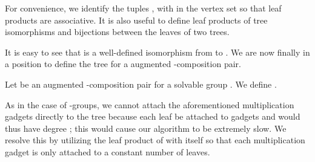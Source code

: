 
For convenience, we identify the tuples ,  with  in the vertex set so that leaf products are associative.  It is also useful to define leaf products of tree isomorphisms and bijections between the leaves of two trees.


It is easy to see that  is a well-defined isomorphism from  to .  We are now finally in a position to define the tree for a augmented -composition pair.

\begin{definition}
  \label{defn:aug-comp}
  Let  be an augmented -composition pair for a solvable group .  We define .
\end{definition}

As in the case of -groups, we cannot attach the aforementioned multiplication gadgets directly to the tree  because each leaf be attached to  gadgets and would thus have degree ; this would cause our algorithm to be extremely slow.  We resolve this by utilizing the leaf product of  with itself so that each multiplication gadget is only attached to a constant number of leaves.

